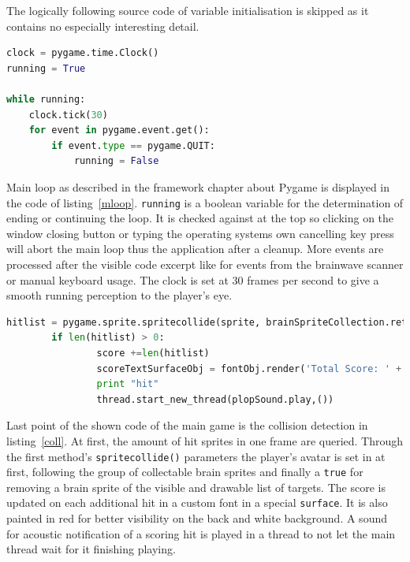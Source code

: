 \documentclass[bibtotocnumbered, headsepline,normalheadings,12pt]{report}
\begin{document}
The logically following source code of variable initialisation is skipped as it contains no especially interesting detail.


\begin{lstlisting}[float,language=Python,caption=Start of Main Loop,label=mloop]
clock = pygame.time.Clock()
running = True

while running:
    clock.tick(30)
    for event in pygame.event.get():
        if event.type == pygame.QUIT:
            running = False
\end{lstlisting}

Main loop as described in the framework chapter about Pygame is displayed in the code of listing~\ref{mloop}. \texttt{running} is 
a boolean variable for the determination of ending or continuing the loop. It is checked against at the top so 
clicking on the window closing button or typing the operating systems own cancelling key press will abort the main loop thus
the application after a cleanup.  
More events are processed after the visible code excerpt like for events from the brainwave scanner or manual keyboard usage.
The clock is set at 30 frames per second to give a smooth running perception to the player's eye.

\begin{lstlisting}[float,language=Python,caption=Collison Detection,label=coll]
hitlist = pygame.sprite.spritecollide(sprite, brainSpriteCollection.returnList(), True)
        if len(hitlist) > 0:
                score +=len(hitlist)
                scoreTextSurfaceObj = fontObj.render('Total Score: ' + str(score), True, (0,0,0), (155,0,0))
                print "hit"
                thread.start_new_thread(plopSound.play,())
\end{lstlisting}

Last point of the shown code of the main game is the collision detection in listing~\ref{coll}. At first, the 
amount of hit sprites in one frame are queried. Through the first method's \texttt{spritecollide()} parameters 
the player's avatar is set in at first, following the group of collectable brain sprites and finally a \texttt{true} for
removing a brain sprite of the visible and drawable list of targets. 
The score is updated on each additional hit in a custom font in a special \texttt{surface}. It is also painted in red for 
better visibility on the back and white background.
A sound for acoustic notification of a scoring hit is played in a thread to not let the main thread wait for it finishing playing.
\end{document}
